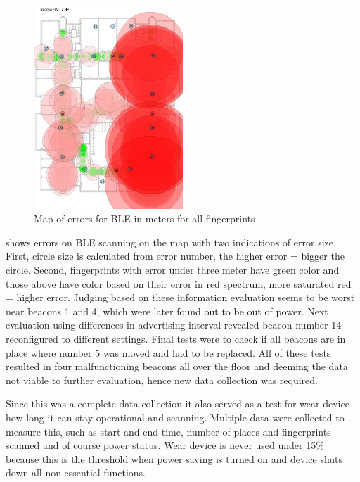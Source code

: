 \begin{figure}[H]
	\begin{centering}
		\includegraphics[width=0.5\textwidth]{img/second_data_collection_errors}
		\par\end{centering}
	\caption{Map of errors for BLE in meters for all fingerprints}
	\label{fig02c06}
\end{figure}

 shows errors on BLE scanning on the map with two indications of error size. First, circle size is calculated from error number, the higher error = bigger the circle. Second, fingerprints with error under three meter have green color and those above have color based on their error in red spectrum, more saturated red = higher error. Judging based on these information evaluation seems to be worst near beacons 1 and 4, which were later found out to be out of power. Next evaluation using differences in advertising interval revealed beacon number 14 reconfigured to different settings. Final tests were to check if all beacons are in place where number 5 was moved and had to be replaced. All of these tests resulted in four malfunctioning beacons all over the floor and deeming the data not viable to further evaluation, hence new data collection was required.

Since this was a complete data collection it also served as a test for wear device how long it can stay operational and scanning. Multiple data were collected to measure this, such as start and end time, number of places and fingerprints scanned and of course power status. Wear device is never used under 15\% because this is the threshold when power saving is turned on and device shuts down all non essential functions.

